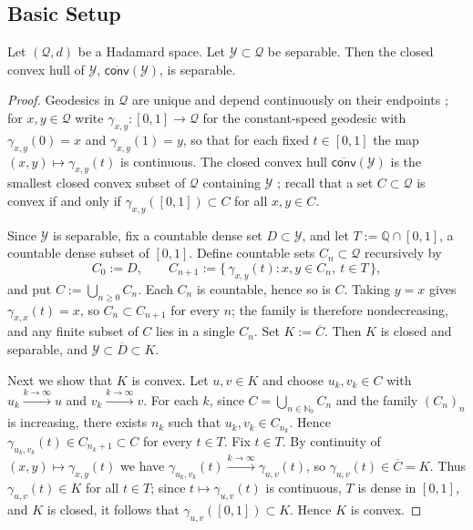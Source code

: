 \documentclass{article}
\newcommand*{\mc}[1]{\mathcal{#1}}
\newcommand*{\ms}[1]{\mathsf{#1}}
\newcommand{\Nn}{\mathbb{N}_0}
\newcommand{\Q}{\mathbb{Q}}
\begin{document}
\subsection{Basic Setup}

\begin{lemma}\label{lmm:convsepa}
    Let $(\mc Q, d)$ be a Hadamard space. Let $\mc Y \subset \mc Q$ be separable. Then the closed convex hull of $\mc Y$, $\overline{\ms{conv}}(\mc Y)$, is separable.
\end{lemma}

\begin{proof}
    Geodesics in $\mc Q$ are unique and depend continuously on their endpoints
    \cite[Proposition 2.3]{sturm03}; for $x,y\in\mc Q$ write
    $\gamma_{x,y}\colon[0,1]\to\mc Q$ for the constant-speed geodesic with
    $\gamma_{x,y}(0)=x$ and $\gamma_{x,y}(1)=y$, so that for each fixed
    $t\in[0,1]$ the map $(x,y)\mapsto\gamma_{x,y}(t)$ is continuous. The closed
    convex hull $\overline{\ms{conv}}(\mc Y)$ is the smallest closed convex subset
    of $\mc Q$ containing $\mc Y$ \cite[Remark 2.7]{sturm03}; recall that a set
    $C\subset\mc Q$ is convex if and only if $\gamma_{x,y}([0,1])\subset C$
    for all $x,y\in C$.
    
    Since $\mc Y$ is separable, fix a countable dense set $D\subset\mc Y$, and
    let $T:=\Q\cap[0,1]$, a countable dense subset of $[0,1]$. Define
    countable sets $C_n\subset\mc Q$ recursively by
    \[
        C_0:=D,\qquad
        C_{n+1}:=\bigl\{\,\gamma_{x,y}(t): x,y\in C_n,\ t\in T\,\bigr\},
    \]
    and put $C:=\bigcup_{n\ge0}C_n$. Each $C_n$ is countable, hence so is $C$.
    Taking $y=x$ gives $\gamma_{x,x}(t)=x$, so $C_n\subset C_{n+1}$ for every
    $n$; the family is therefore nondecreasing, and any finite subset of $C$
    lies in a single $C_n$. Set $K:=\overline{C}$. Then $K$ is closed and
    separable, and $\mc Y\subset\overline D\subset K$.
    
    Next we show that $K$ is convex. Let $u,v\in K$ and choose $u_k,v_k\in C$ with
    $u_k\xrightarrow{k\to\infty} u$ and $v_k\xrightarrow{k\to\infty} v$. 
    For each $k$, since $C=\bigcup_{n\in\Nn}C_n$ and the family $(C_n)_n$ is increasing, there exists $n_k$ such that $u_k,v_k\in C_{n_k}$.
    Hence $\gamma_{u_k,v_k}(t)\in C_{n_k+1}\subset C$ for every $t\in T$.
    Fix $t\in T$. By continuity of $(x,y)\mapsto\gamma_{x,y}(t)$ we have
    $\gamma_{u_k,v_k}(t)\xrightarrow{k\to\infty}\gamma_{u,v}(t)$, so $\gamma_{u,v}(t)\in\overline C=K$.
    Thus $\gamma_{u,v}(t)\in K$ for all $t\in T$; since $t\mapsto\gamma_{u,v}(t)$
    is continuous, $T$ is dense in $[0,1]$, and $K$ is closed, it follows that
    $\gamma_{u,v}([0,1])\subset K$. Hence $K$ is convex.
    

\end{proof}
\end{document}
